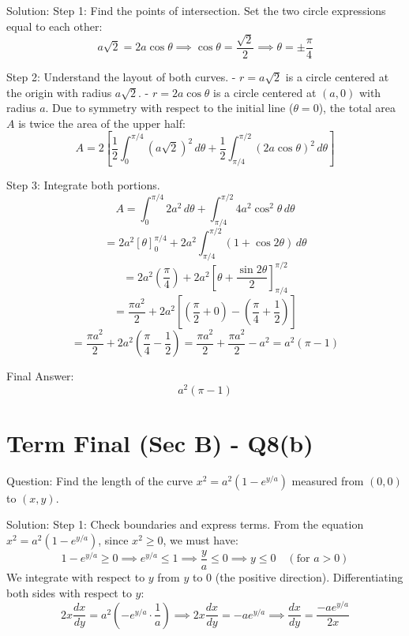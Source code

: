 \documentclass{article}
\begin{document}
Solution:
Step 1: Find the points of intersection.
Set the two circle expressions equal to each other:
\[
a\sqrt{2} = 2a \cos \theta \implies \cos \theta = \frac{\sqrt{2}}{2} \implies \theta = \pm \frac{\pi}{4}
\]

Step 2: Understand the layout of both curves.
- \(r = a\sqrt{2}\) is a circle centered at the origin with radius \(a\sqrt{2}\).
- \(r = 2a\cos\theta\) is a circle centered at \((a, 0)\) with radius \(a\).
Due to symmetry with respect to the initial line (\(\theta=0\)), the total area \(A\) is twice the area of the upper half:
\[
A = 2 \left[ \frac{1}{2} \int_0^{\pi/4} \left(a\sqrt{2}\right)^2 \, d\theta + \frac{1}{2} \int_{\pi/4}^{\pi/2} (2a\cos\theta)^2 \, d\theta \right]
\]

Step 3: Integrate both portions.
\[
A = \int_0^{\pi/4} 2a^2 \, d\theta + \int_{\pi/4}^{\pi/2} 4a^2 \cos^2 \theta \, d\theta
\]
\[
= 2a^2 [\theta]_0^{\pi/4} + 2a^2 \int_{\pi/4}^{\pi/2} (1 + \cos 2\theta) \, d\theta
\]
\[
= 2a^2 \left(\frac{\pi}{4}\right) + 2a^2 \left[ \theta + \frac{\sin 2\theta}{2} \right]_{\pi/4}^{\pi/2}
\]
\[
= \frac{\pi a^2}{2} + 2a^2 \left[ \left(\frac{\pi}{2} + 0\right) - \left(\frac{\pi}{4} + \frac{1}{2}\right) \right]
\]
\[
= \frac{\pi a^2}{2} + 2a^2 \left( \frac{\pi}{4} - \frac{1}{2} \right) = \frac{\pi a^2}{2} + \frac{\pi a^2}{2} - a^2 = a^2(\pi - 1)
\]

Final Answer:
\[
\boxed{a^2(\pi - 1)}
\]

\section*{Term Final (Sec B) - Q8(b)}
Question:
Find the length of the curve \(x^2 = a^2(1 - e^{y/a})\) measured from \((0,0)\) to \((x,y)\).

Solution:
Step 1: Check boundaries and express terms.
From the equation \(x^2 = a^2(1 - e^{y/a})\), since \(x^2 \ge 0\), we must have:
\[
1 - e^{y/a} \ge 0 \implies e^{y/a} \le 1 \implies \frac{y}{a} \le 0 \implies y \le 0 \quad (\text{for } a > 0)
\]
We integrate with respect to \(y\) from \(y\) to \(0\) (the positive direction).
Differentiating both sides with respect to \(y\):
\[
2x \frac{dx}{dy} = a^2 \left( -e^{y/a} \cdot \frac{1}{a} \right) \implies 2x \frac{dx}{dy} = -a e^{y/a} \implies \frac{dx}{dy} = \frac{-a e^{y/a}}{2x}
\]
\end{document}
